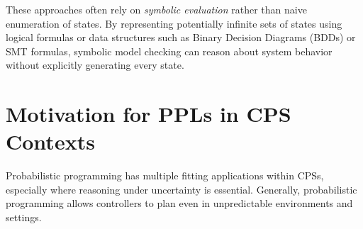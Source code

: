 These approaches often rely on \textit{symbolic evaluation} rather than naive enumeration of states. By representing potentially infinite sets of states using logical
formulas or data structures such as Binary Decision Diagrams (BDDs) or SMT formulas, symbolic model checking can reason about system behavior without explicitly
generating every state.

\section{Motivation for PPLs in CPS Contexts}

Probabilistic programming has multiple fitting applications within CPSs, especially where reasoning under uncertainty is essential. Generally, probabilistic programming
allows controllers to plan even in unpredictable environments and settings.

